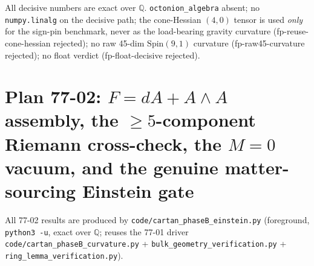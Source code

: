 \documentclass[11pt]{article}
\newcommand{\Q}{\mathbb{Q}}
\theoremstyle{definition}\newtheorem{remark}{Remark}
\theoremstyle{plain}\newtheorem{proposition}{Proposition}
\begin{document}
All decisive numbers are exact over $\Q$. \texttt{octonion\_algebra} absent; no \texttt{numpy.linalg}
on the decisive path; the cone-Hessian $(4,0)$ tensor is used \emph{only} for the sign-pin benchmark,
never as the load-bearing gravity curvature (fp-reuse-cone-hessian rejected); no raw 45-dim
$\mathrm{Spin}(9,1)$ curvature (fp-raw45-curvature rejected); no float verdict (fp-float-decisive rejected).

\part*{Plan 77-02: $F=dA+A\wedge A$ assembly, the $\geq5$-component Riemann
cross-check, the $M=0$ vacuum, and the genuine matter-sourcing Einstein gate}
\setcounter{section}{0}
\renewcommand{\thesection}{B.\arabic{section}}

All 77-02 results are produced by \texttt{code/cartan\_phaseB\_einstein.py}
(foreground, \texttt{python3 -u}, exact over $\Q$; reuses the 77-01 driver
\texttt{code/cartan\_phaseB\_curvature.py} + \texttt{bulk\_geometry\_verification.py} +
\texttt{ring\_lemma\_verification.py}).
\end{document}
